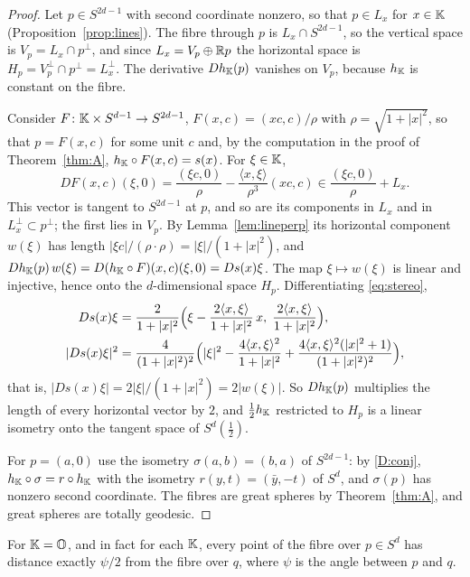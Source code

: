 \begin{proof}
Let $p\in S^{2d-1}$ with second coordinate nonzero, so that $p\in L_x$ for $x\in\mathbb{K}$ (Proposition~\ref{prop:lines}). The fibre through $p$ is $L_x\cap S^{2d-1}$, so the vertical space is $V_p=L_x\cap p^\perp$, and since $L_x=V_p\oplus\mathbb{R} p$ the horizontal space is $H_p=V_p^\perp\cap p^\perp=L_x^\perp$. The derivative $Dh_{\mathbb{K}}(p)$ vanishes on $V_p$, because $h_{\mathbb{K}}$ is constant on the fibre.

Consider $F\colon\mathbb{K}\times S^{d-1}\to S^{2d-1}$, $F(x,c)=(xc,c)/\rho$ with $\rho=\sqrt{1+|x|^2}$, so that $p=F(x,c)$ for some unit $c$ and, by the computation in the proof of Theorem~\ref{thm:A}, $h_{\mathbb{K}}\circ F(x,c)=s(x)$. For $\xi\in\mathbb{K}$,
\[
DF(x,c)(\xi,0)=\frac{(\xi c,0)}{\rho}-\frac{\langle x,\xi\rangle}{\rho^3}(xc,c)\in\frac{(\xi c,0)}{\rho}+L_x .
\]
This vector is tangent to $S^{2d-1}$ at $p$, and so are its components in $L_x$ and in $L_x^\perp\subset p^\perp$; the first lies in $V_p$. By Lemma~\ref{lem:lineperp} its horizontal component $w(\xi)$ has length $|\xi c|/(\rho\cdot\rho)=|\xi|/(1+|x|^2)$, and $Dh_{\mathbb{K}}(p)\,w(\xi)=D(h_{\mathbb{K}}\circ F)(x,c)(\xi,0)=Ds(x)\xi$. The map $\xi\mapsto w(\xi)$ is linear and injective, hence onto the $d$-dimensional space $H_p$. Differentiating \eqref{eq:stereo},
\begin{align*}
Ds(x)\xi&=\frac{2}{1+|x|^2}\Bigl(\xi-\frac{2\langle x,\xi\rangle}{1+|x|^2}\,x,\;\frac{2\langle x,\xi\rangle}{1+|x|^2}\Bigr),\\
|Ds(x)\xi|^2&=\frac{4}{(1+|x|^2)^2}\Bigl(|\xi|^2-\frac{4\langle x,\xi\rangle^2}{1+|x|^2}+\frac{4\langle x,\xi\rangle^2(|x|^2+1)}{(1+|x|^2)^2}\Bigr),
\end{align*}
that is, $|Ds(x)\xi|=2|\xi|/(1+|x|^2)=2|w(\xi)|$. So $Dh_{\mathbb{K}}(p)$ multiplies the length of every horizontal vector by $2$, and $\tfrac12h_{\mathbb{K}}$ restricted to $H_p$ is a linear isometry onto the tangent space of $S^d(\tfrac12)$.

For $p=(a,0)$ use the isometry $\sigma(a,b)=(b,a)$ of $S^{2d-1}$: by \ref{D:conj}, $h_{\mathbb{K}}\circ\sigma=r\circ h_{\mathbb{K}}$ with the isometry $r(y,t)=(\bar y,-t)$ of $S^d$, and $\sigma(p)$ has nonzero second coordinate. The fibres are great spheres by Theorem~\ref{thm:A}, and great spheres are totally geodesic.
\end{proof}

\begin{proposition}\label{prop:octparallel}
For $\mathbb{K}=\mathbb{O}$, and in fact for each $\mathbb{K}$, every point of the fibre over $p\in S^d$ has distance exactly $\psi/2$ from the fibre over $q$, where $\psi$ is the angle between $p$ and $q$.
\end{proposition}

